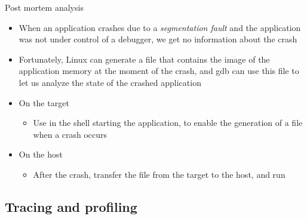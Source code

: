 \begin{frame}{Post mortem analysis}
  \begin{itemize}
  \item When an application crashes due to a {\em segmentation fault}
    and the application was not under control of a debugger, we get no
    information about the crash
  \item Fortunately, Linux can generate a  file that
    contains the image of the application memory at the moment of the
    crash, and gdb can use this  file to let us analyze the
    state of the crashed application
  \item On the target
    \begin{itemize}
    \item Use  in the shell starting the
    application, to enable the generation of a  file
    when a crash occurs
    \end{itemize}
  \item On the host
    \begin{itemize}
    \item After the crash, transfer the  file from the target to
      the host, and run
    \end{itemize}
  \end{itemize}
\end{frame}

\subsection{Tracing and profiling}




